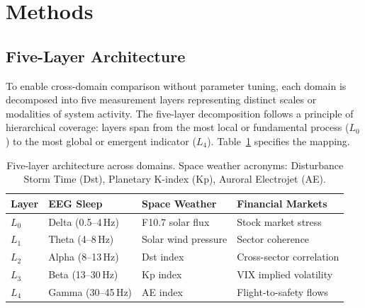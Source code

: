 \documentclass[12pt,a4paper]{article}
\begin{document}
\section{Methods}

\subsection{Five-Layer Architecture}

To enable cross-domain comparison without parameter tuning, each domain is decomposed into five measurement layers representing distinct scales or modalities of system activity. The five-layer decomposition follows a principle of hierarchical coverage: layers span from the most local or fundamental process ($L_0$) to the most global or emergent indicator ($L_4$). Table~\ref{tab:layers} specifies the mapping.

\begin{table}[H]
\caption{Five-layer architecture across domains. Space weather acronyms: Disturbance Storm Time (Dst), Planetary K-index (Kp), Auroral Electrojet (AE).\label{tab:layers}}
\begin{tabular}{@{}lp{2.0cm}p{2.0cm}p{2.1cm}@{}}
\toprule
Layer & EEG Sleep & Space Weather & Financial Markets \\
\midrule
$L_0$ & Delta (0.5--4\,Hz) & F10.7 solar flux & Stock market stress \\
$L_1$ & Theta (4--8\,Hz) & Solar wind pressure & Sector coherence \\
$L_2$ & Alpha (8--13\,Hz) & Dst index & Cross-sector correlation \\
$L_3$ & Beta (13--30\,Hz) & Kp index & VIX implied volatility \\
$L_4$ & Gamma (30--45\,Hz) & AE index & Flight-to-safety flows \\
\bottomrule
\end{tabular}
\end{table}
\end{document}
